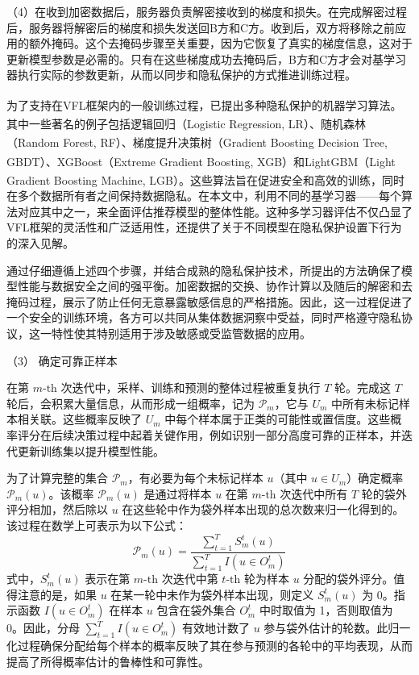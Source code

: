 （4）在收到加密数据后，服务器负责解密接收到的梯度和损失。在完成解密过程后，服务器将解密后的梯度和损失发送回B方和C方。收到后，双方将移除之前应用的额外掩码。这个去掩码步骤至关重要，因为它恢复了真实的梯度信息，这对于更新模型参数是必需的。只有在这些梯度成功去掩码后，B方和C方才会对基学习器执行实际的参数更新，从而以同步和隐私保护的方式推进训练过程。

为了支持在VFL框架内的一般训练过程，已提出多种隐私保护的机器学习算法\textsuperscript{\cite{yang2019federated}}。其中一些著名的例子包括逻辑回归（Logistic Regression, LR）\textsuperscript{\cite{he2021secure,yang2019parallel}}、随机森林（Random Forest, RF）\textsuperscript{\cite{yao2022efficient}}、梯度提升决策树（Gradient Boosting Decision Tree, GBDT）\textsuperscript{\cite{he2021secure}}、XGBoost（Extreme Gradient Boosting, XGB）\textsuperscript{\cite{xu2021efficient,wang2022feverless}}和LightGBM（Light Gradient Boosting Machine, LGB）\textsuperscript{\cite{feng2019securegbm}}。这些算法旨在促进安全和高效的训练，同时在多个数据所有者之间保持数据隐私。在本文中，利用不同的基学习器——每个算法对应其中之一，来全面评估推荐模型的整体性能。这种多学习器评估不仅凸显了VFL框架的灵活性和广泛适用性，还提供了关于不同模型在隐私保护设置下行为的深入见解。

通过仔细遵循上述四个步骤，并结合成熟的隐私保护技术，所提出的方法确保了模型性能与数据安全之间的强平衡。加密数据的交换、协作计算以及随后的解密和去掩码过程，展示了防止任何无意暴露敏感信息的严格措施。因此，这一过程促进了一个安全的训练环境，各方可以共同从集体数据洞察中受益，同时严格遵守隐私协议，这一特性使其特别适用于涉及敏感或受监管数据的应用。 

（3） 确定可靠正样本

在第 $m\text{-th}$ 次迭代中，采样、训练和预测的整体过程被重复执行 $T$ 轮。完成这 $T$ 轮后，会积累大量信息，从而形成一组概率，记为 ${{\mathsf{\mathcal{P}}}_{m}}$，它与 ${{U}_{m}}$ 中所有未标记样本相关联。这些概率反映了 ${{U}_{m}}$ 中每个样本属于正类的可能性或置信度。这些概率评分在后续决策过程中起着关键作用，例如识别一部分高度可靠的正样本，并迭代更新训练集以提升模型性能。

为了计算完整的集合 ${{\mathsf{\mathcal{P}}}_{m}}$，有必要为每个未标记样本 $u$（其中 $u\in {{U}_{m}}$）确定概率 ${{\mathsf{\mathcal{P}}}_{m}}(u)$。该概率 ${{\mathsf{\mathcal{P}}}_{m}}(u)$ 是通过将样本 $u$ 在第 $m\text{-th}$ 次迭代中所有 $T$ 轮的袋外评分相加，然后除以 $u$ 在这些轮中作为袋外样本出现的总次数来归一化得到的。该过程在数学上可表示为以下公式：
\begin{equation}
	{{\mathsf{\mathcal{P}}}_{m}}(u)=\frac{\sum\nolimits_{t=1}^{T}{S_{m}^{t}}(u)}{\sum\nolimits_{t=1}^{T}{I(u\in O_{m}^{t})}}
\end{equation}
式中，$S_{m}^{t}(u)$ 表示在第 $m\text{-th}$ 次迭代中第 $t\text{-th}$ 轮为样本 $u$ 分配的袋外评分。值得注意的是，如果 $u$ 在某一轮中未作为袋外样本出现，则定义 $S_{m}^{t}(u)$ 为 0。指示函数 $I(u\in O_{m}^{t})$ 在样本 $u$ 包含在袋外集合 $O_{m}^{t}$ 中时取值为 1，否则取值为 0。因此，分母 $\sum\nolimits_{t=1}^{T}{I(u\in O_{m}^{t})}$ 有效地计数了 $u$ 参与袋外估计的轮数。此归一化过程确保分配给每个样本的概率反映了其在参与预测的各轮中的平均表现，从而提高了所得概率估计的鲁棒性和可靠性。

